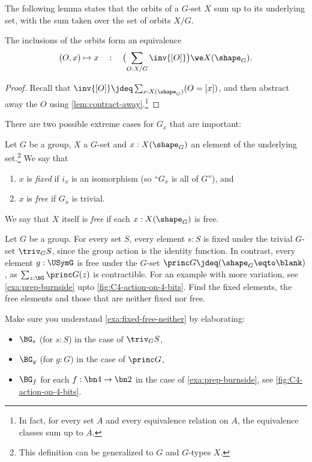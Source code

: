 The following lemma states that the orbits of a $G$-set $X$
sum up to its underlying set, with the sum taken over the set
of orbits $X/G$.

\begin{lemma}
  \label{lem:splitting into orbits}
  The inclusions of the orbits form an equivalence
\[
  (O,x)\mapsto x \quad:\quad
  \bigl(\sum_{O:X/G} \inv{[O]} \bigr) \we X(\sh_G).
\]
\end{lemma}
\begin{proof}
Recall that $\inv{[O]}\jdeq \sum_{x:X(\sh_G)}(O=[x])$, 
and then abstract
away the $O$ using \cref{lem:contract-away}.\footnote{%
In fact, for every set $A$ and every equivalence relation on $A$,
the equivalence classes sum up to $A$.}
\end{proof}

There are two possible extreme cases for $G_x$ that are important:
\begin{definition}\label{def:fixed-free}
  Let $G$ be a group, $X$ a $G$-set and $x:X(\sh_G)$ an element of the underlying set.\footnote{%
  This definition can be generalized to \inftygps $G$ and $G$-types $X$.}
  We say that
  \begin{enumerate}
  \item $x$ is \emph{fixed}
    if $i_x$ is an isomorphism (so ``$G_x$ is all of $G$''), and
  \item $x$ is \emph{free}
    if $G_x$ is trivial.
  \end{enumerate}
  We say that $X$ itself is \emph{free} if each $x:X(\sh_G)$ is free.
\end{definition}

\begin{example}\label{exa:fixed-free-neither}
Let $G$ be a group. For every set $S$, every element $s:S$ is fixed
under the trivial $G$-set $\triv_G S$, since the group action is the 
identity function. In contrast,
every element $g:\USymG$ is free under the $G$-set 
$\princ G \jdeq(\sh_G \eqto \blank)$, 
as $\sum_{z:\BG}\princ G(z)$ is contractible.
For an example with more variation, see \cref{exa:prep-burnside} upto
\cref{fig:C4-action-on-4-bits}. Find the fixed elements, the free elements
and those that are neither fixed nor free.
\end{example}

\begin{xca}\label{xca:fixed-free-neither}
Make sure you understand \cref{exa:fixed-free-neither} by
elaborating:
\begin{itemize}
\item $\BG_s$ (for $s:S$) in the case of $\triv_G S$,
\item $\BG_g$ (for $g:G$) in the case of $\princ G$,
\item $\BG_f$ for each $f:\bn4\to\bn2$
in the case of \cref{exa:prep-burnside}, see \cref{fig:C4-action-on-4-bits}.\qedhere
\end{itemize}
\end{xca}

